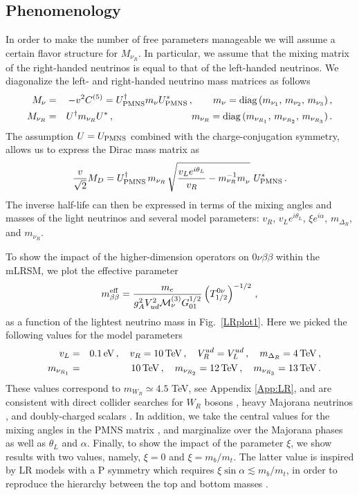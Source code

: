 \documentclass[letterpaper,11pt]{article}
\newcommand{\al}{\alpha}
\newcommand{\bt}{\beta}
\newcommand{\Dt}{\Delta}
\newcommand{\bea}{\begin{eqnarray}}
\newcommand{\eea}{\end{eqnarray}}
\newcommand{\sq}{^{2}}
\newcommand{\nn}{\nonumber}
\begin{document}
\subsection{Phenomenology}
In order to make the number of free parameters manageable we will assume a certain flavor structure for $M_{\nu_R}$. In particular, we assume that the mixing matrix of the right-handed neutrinos is equal to that of the left-handed neutrinos. We diagonalize the  left- and right-handed neutrino mass matrices as follows
\bea
M_\nu &=& -v^2 C^{(5)} = U^\dagger_{\rm PMNS} m_\nu U^*_{\rm PMNS}\,,\qquad m_\nu=  {\rm diag}\,(m_{\nu_{1}},\,m_{\nu_{2}},\,m_{\nu_{3}})\,,\nn\\
M_{\nu_R} &=& U^\dagger m_{\nu_R} U^*\,,\qquad\qquad  \qquad   \qquad   m_{\nu_R} = {\rm diag}\,(m_{\nu_{R_1}},\, m_{\nu_{R_2}},\, m_{\nu_{R_3}})\,.
\eea
The assumption $U=U_{\rm PMNS}$ combined with the  charge-conjugation symmetry, allows us to express the Dirac mass matrix as \cite{Nemevsek:2012iq}
\bea
\frac{v}{\sqrt{2}}  M_D = U^\dagger_{\rm PMNS} \, m_{\nu_R} \, \sqrt{\frac{v_L e^{i\theta_L}}{v_R}-m_{\nu_R}^{-1}m_\nu^{}} \  U_{\rm PMNS}^*\,.\label{Eq:MD}
\eea
The inverse half-life can then be expressed in terms of the mixing angles and masses of the light neutrinos and several model parameters: $v_R$, $v_L e^{i\theta_L}$, $\xi e^{i\al}$, $m_{\Dt_R}$, and $m_{\nu_R}$.

To show the impact of the higher-dimension operators on $0\nu\beta\beta$ within the mLRSM, we plot the effective parameter
\bea
m_{\bt\bt}^{\rm eff } = \frac{m_e}{g_A\sq V_{ud}\sq  \mathcal{M}^{(3)}_\nu G_{01}^{1/2}}\left(T_{1/2}^{0\nu}\right)^{-1/2}\,, 
\eea
 as a function of the lightest neutrino mass in Fig.\ \ref{LRplot1}. Here we picked the following values for the model parameters
\bea\label{eq:LRvalues}
v_L&=&0.1 \, {\rm eV}\,, \quad v_R=10\, {\rm TeV}\,,\quad V_R^{ud}=V_L^{ud}\,,\quad m_{\Dt_R} = 4\, {\rm TeV}\,,\nn\\
\quad m_{\nu_{R_1}}&=&10\,{\rm TeV}\,,\quad m_{\nu_{R_2}}=12\,{\rm TeV}\,,\quad m_{\nu_{R_3}}=13\,{\rm TeV}\,.
\eea
These values correspond to $m_{W_R}\simeq 4.5$ TeV, see Appendix \ref{App:LR}, and are consistent with direct collider searches for $W_R$ bosons \cite{CMS:2017xrr,Aaboud:2017yvp}, heavy Majorana neutrinos
\cite{Aad:2015xaa,Sirunyan:2018pom}, and doubly-charged scalars \cite{CMS:2017pet,Aaboud:2017qph}. In addition, 
we take the central values for the mixing angles in the PMNS matrix \cite{Olive:2016xmw}, and marginalize over the Majorana phases as well as $\theta_L$ and $\al$. Finally, to show the impact of the parameter $\xi$, we show results with two values, namely, $\xi=0$ and $\xi=m_b/m_t$. The latter value is inspired by LR models with a P symmetry which requires $\xi \sin\al \lesssim m_b/m_t$, in order to reproduce the hierarchy between the top and bottom masses \cite{Maiezza:2010ic}.
\end{document}

